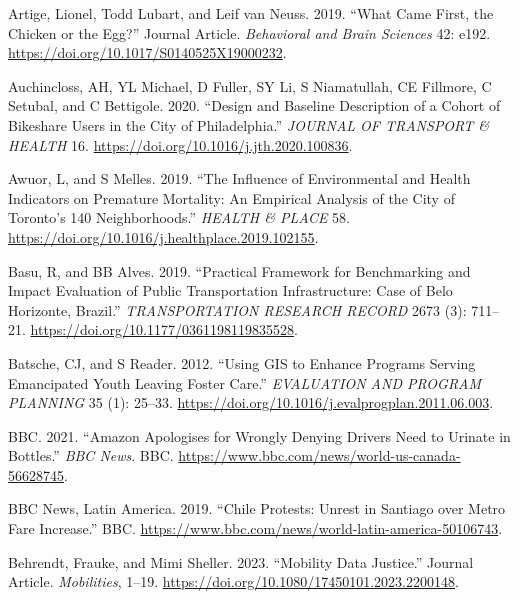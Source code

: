 \documentclass[12pt, oneside]{report}
\newlength{\cslhangindent}
\newlength{\cslentryspacingunit} %
\newenvironment{CSLReferences}[2] %
 {%
  \setlength{\parindent}{0pt}
  \ifodd #1
  \let\oldpar\par
  \def\par{\hangindent=\cslhangindent\oldpar}
  \fi
  \setlength{\parskip}{#2\cslentryspacingunit}
 }%
 {}
\begin{document}
\begin{CSLReferences}{1}{0}
\leavevmode{}%
Artige, Lionel, Todd Lubart, and Leif van Neuss. 2019. {``What Came
First, the Chicken or the Egg?''} Journal Article. \emph{Behavioral and
Brain Sciences} 42: e192.
\url{https://doi.org/10.1017/S0140525X19000232}.

\leavevmode{}%
Auchincloss, AH, YL Michael, D Fuller, SY Li, S Niamatullah, CE
Fillmore, C Setubal, and C Bettigole. 2020. {``Design and Baseline
Description of a Cohort of Bikeshare Users in the City of
{Philadelphia}.''} \emph{JOURNAL OF TRANSPORT \& HEALTH} 16.
\url{https://doi.org/10.1016/j.jth.2020.100836}.

\leavevmode{}%
Awuor, L, and S Melles. 2019. {``The Influence of Environmental and
Health Indicators on Premature Mortality: {An} Empirical Analysis of the
{City} of {Toronto}'s 140 Neighborhoods.''} \emph{HEALTH \& PLACE} 58.
\url{https://doi.org/10.1016/j.healthplace.2019.102155}.

\leavevmode{}%
Basu, R, and BB Alves. 2019. {``Practical {Framework} for {Benchmarking}
and {Impact Evaluation} of {Public Transportation Infrastructure}:
{Case} of {Belo Horizonte}, {Brazil}.''} \emph{TRANSPORTATION RESEARCH
RECORD} 2673 (3): 711--21.
\url{https://doi.org/10.1177/0361198119835528}.

\leavevmode{}%
Batsche, CJ, and S Reader. 2012. {``Using {GIS} to Enhance Programs
Serving Emancipated Youth Leaving Foster Care.''} \emph{EVALUATION AND
PROGRAM PLANNING} 35 (1): 25--33.
\url{https://doi.org/10.1016/j.evalprogplan.2011.06.003}.

\leavevmode{}%
BBC. 2021. {``Amazon Apologises for Wrongly Denying Drivers Need to
Urinate in Bottles.''} \emph{BBC News}. BBC.
\url{https://www.bbc.com/news/world-us-canada-56628745}.

\leavevmode{}%
BBC News, Latin America. 2019. {``Chile Protests: Unrest in Santiago
over Metro Fare Increase.''} BBC.
\url{https://www.bbc.com/news/world-latin-america-50106743}.

\leavevmode{}%
Behrendt, Frauke, and Mimi Sheller. 2023. {``Mobility Data Justice.''}
Journal Article. \emph{Mobilities}, 1--19.
\url{https://doi.org/10.1080/17450101.2023.2200148}.


\end{CSLReferences}
\end{document}
